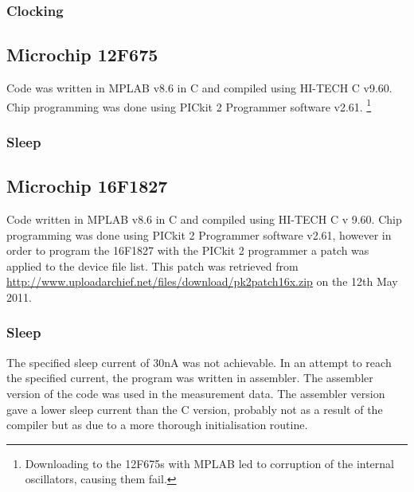 


\subsubsection{Clocking}




\subsection{Microchip 12F675}

Code was written in MPLAB v8.6 in C and compiled using HI-TECH C v9.60.
Chip programming was done using PICkit 2 Programmer software v2.61.
\footnote{Downloading to the 12F675s with MPLAB led to corruption of the internal
oscillators, causing them fail.%
}


\subsubsection{Sleep}


\subsection{Microchip 16F1827}

Code written in MPLAB v8.6 in C and compiled using HI-TECH C v 9.60.
Chip programming was done using PICkit 2 Programmer software v2.61,
however in order to program the 16F1827 with the PICkit 2 programmer
a patch was applied to the device file list. This patch was retrieved
from \url{http://www.uploadarchief.net/files/download/pk2patch16x.zip}
on the 12th May 2011.


\subsubsection{Sleep}

The specified sleep current of 30nA was not achievable. In an attempt
to reach the specified current, the program was written in assembler.
The assembler version of the code was used in the measurement data.
The assembler version gave a lower sleep current than the C version,
probably not as a result of the compiler but as due to a more thorough
initialisation routine.

